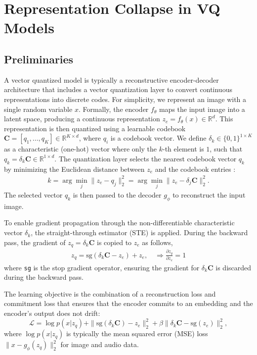\section{Representation Collapse in VQ Models}

\subsection{Preliminaries}

A vector quantized model is typically a reconstructive encoder-decoder architecture that includes a vector quantization layer to convert continuous representations into discrete codes. For simplicity, we represent an image with a single random variable $x$. Formally, the encoder $f_{\theta}$ maps the input image into a latent space, producing a continuous representation $z_{e}=f_{\theta}(x) \in \mathbb{R}^d$. This representation is then quantized using a learnable codebook $\bm{C}=[q_1,\ldots,q_K]\in \mathbb{R}^{K\times d}$, where $q_i$ is a codebook vector. We define $\delta_{k}\in \{0,1\}^{1\times K}$ as a characteristic (one-hot) vector where only the $k$-th element is $1$, such that $q_k = \delta_{k}\bm{C}\in \mathbb{R}^{1\times d}$. The quantization layer selects the nearest codebook vector $q_k$ by minimizing the Euclidean distance between $z_e$ and the codebook entries \cite{NIPS2017_7a98af17}:
\begin{align}
    k = \arg\min_{j} \|z_{e}-q_j\|^2_2 = \arg\min_{j} \|z_{e}-\delta_{j}\bm{C}\|^2_2.
\end{align}
The selected vector $q_k$ is then passed to the decoder $g_{\phi}$ to reconstruct the input image. 

To enable gradient propagation through the non-differentiable characteristic vector $\delta_{k}$, the straight-through estimator (STE) \cite{bengio2013estimating} is applied. During the backward pass, the gradient of $z_q=\delta_k \bm{C}$ is copied to $z_e$ as follows,
\begin{align}
    z_q = \text{sg}(\delta_{k}\bm{C} - z_e) + z_e,\quad \Rightarrow \frac{\partial z_q}{\partial z_e}=1
\end{align}
where \texttt{sg} is the stop gradient operator, ensuring the gradient for $\delta_k \bm{C}$ is discarded during the backward pass.

The learning objective is the combination of a reconstruction loss and commitment loss that ensures that the encoder commits to an embedding and the encoder's output does not drift:
\begin{equation}
    \mathcal{L} = \log p(x|z_q) + \|\text{sg}(\delta_{k}\bm{C})-z_e\|^2_2 + \beta \|\delta_{k}\bm{C} - \text{sg}(z_e)\|^2_2,
\end{equation}
where $\log p(x|z_q)$ is typically the mean squared error (MSE) loss $\|x-g_{\phi}(z_q)\|^2_2$ for image and audio data.



